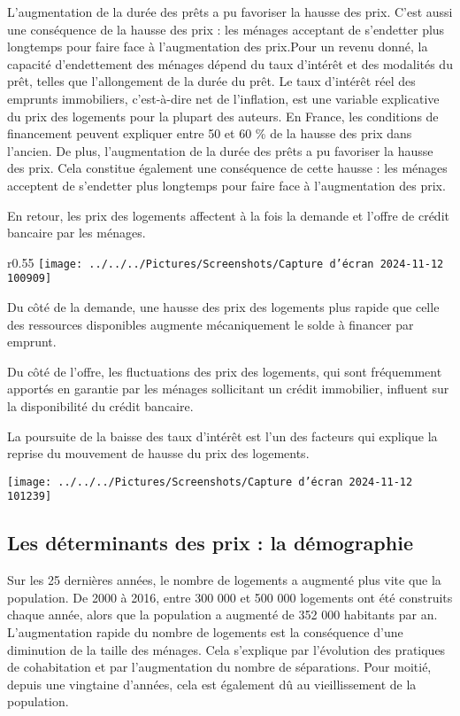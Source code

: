 \documentclass[a4paper, 12pt]{report}
\begin{document}
L’augmentation de la durée des prêts a pu favoriser la hausse des prix. C’est aussi une conséquence de la hausse des prix : les ménages acceptant de s’endetter plus longtemps pour faire face à l’augmentation des prix.Pour un revenu donné, la capacité d’endettement des ménages dépend du taux d’intérêt et des modalités du prêt, telles que l’allongement de la durée du prêt. Le taux d’intérêt réel des emprunts immobiliers, c’est-à-dire net de l’inflation, est une variable explicative du prix des logements pour la plupart des auteurs. En France, les conditions de financement peuvent expliquer entre 50 et 60 \% de la hausse des prix dans l’ancien. De plus, l’augmentation de la durée des prêts a pu favoriser la hausse des prix. Cela constitue également une conséquence de cette hausse : les ménages acceptent de s’endetter plus longtemps pour faire face à l’augmentation des prix.

En retour, les prix des logements affectent à la fois la demande et l’offre de crédit bancaire par les ménages. 

\begin{wrapfigure}{r}{0.55\textwidth}
	\centering
	\texttt{[image: ../../../Pictures/Screenshots/Capture d'écran 2024-11-12 100909]}
\end{wrapfigure}

Du côté de la demande, une hausse des prix des logements plus rapide que celle des ressources disponibles augmente mécaniquement le solde à financer par emprunt. 

Du côté de l’offre, les fluctuations des prix des logements, qui sont fréquemment apportés en garantie par les ménages sollicitant un crédit immobilier, influent sur la disponibilité du crédit bancaire.



La poursuite de la baisse des taux d’intérêt est l’un des facteurs qui explique la reprise du mouvement de hausse du prix des logements.

\begin{center}
	\texttt{[image: ../../../Pictures/Screenshots/Capture d'écran 2024-11-12 101239]}
\end{center}

\subsection{Les déterminants des prix : la démographie}

Sur les 25 dernières années, le nombre de logements a augmenté plus vite que la population. De 2000 à 2016, entre 300 000 et 500 000 logements ont été construits chaque année, alors que la population a augmenté de 352 000 habitants par an. L’augmentation rapide du nombre de logements est la conséquence d’une diminution de la taille des ménages. Cela s’explique par l’évolution des pratiques de cohabitation et par l’augmentation du nombre de séparations. Pour moitié, depuis une vingtaine d’années, cela est également dû au vieillissement de la population.
\end{document}
